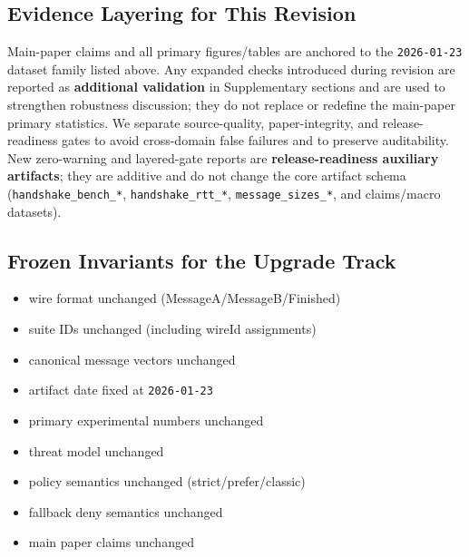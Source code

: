 \documentclass[10pt,journal,compsoc]{IEEEtran}
\providecommand{\tightlist}{%
	  \setlength{\itemsep}{0pt}\setlength{\parskip}{0pt}}
\begin{document}
\subsection*{Evidence Layering for This Revision}

Main-paper claims and all primary figures/tables are anchored to the
\texttt{2026-01-23} dataset family listed above. Any expanded checks
introduced during revision are reported as \textbf{additional validation}
in Supplementary sections and are used to strengthen robustness discussion;
they do not replace or redefine the main-paper primary statistics.
We separate source-quality, paper-integrity, and release-readiness gates
to avoid cross-domain false failures and to preserve auditability.
New zero-warning and layered-gate reports are
\textbf{release-readiness auxiliary artifacts}; they are additive and do
not change the core artifact schema (\texttt{handshake\_bench\_*},
\texttt{handshake\_rtt\_*}, \texttt{message\_sizes\_*}, and
claims/macro datasets).

\subsection*{Frozen Invariants for the Upgrade Track}
\begin{itemize}\tightlist
\item wire format unchanged (MessageA/MessageB/Finished)
\item suite IDs unchanged (including wireId assignments)
\item canonical message vectors unchanged
\item artifact date fixed at \texttt{2026-01-23}
\item primary experimental numbers unchanged
\item threat model unchanged
\item policy semantics unchanged (strict/prefer/classic)
\item fallback deny semantics unchanged
\item main paper claims unchanged
\end{itemize}
\end{document}
